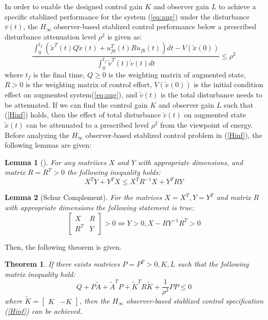 \documentclass{ieeeaccess}
\newtheorem{theorem}{Theorem}
\newtheorem{lemma}{Lemma}
\begin{document}
In order to enable the designed control gain $K$ and observer gain $L$ to achieve a specific stablized performance for the system (\ref{eq:aug}) under the disturbance $\bar{v}(t)$, the $H_\infty$ observer-based stablized control performance below a prescribed disturbance attenuation level $\rho^2$ is given as:
\begin{equation} \label{Hinf}
        \frac{\int_{0}^{t_f}(\tilde{x}^T(t)Q\tilde{x}(t) + u_{fb}^T(t)Ru_{fb}(t))dt - V(\tilde{x}(0))}{\int_{0}^{t_f}\tilde{v}^T(t)\tilde{v}(t)dt}\leq \rho^2
\end{equation}
where $t_f$ is the final time, $Q \geq 0$ is the weighting matrix of augmented state, $R > 0$ is the weighting matrix of control effort, $V(\tilde{x}(0))$ is the initial condition effect on augmented system(\ref{eq:aug}), and $\tilde{v}(t)$ is the total disturbance needs to be attenuated. If we can find the control gain $K$ and observer gain $L$ such that (\ref{Hinf}) holds, then the effect of total disturbance $\tilde{v}(t)$ on augmented state $\tilde{x}(t)$ can be attenuated to a prescribed level $\rho^2$ from the viewpoint of energy. Before analyzing the $H_\infty$ observer-based stablized control problem in (\ref{Hinf}), the following lemmas are given:
\begin{lemma}[\cite{boyd1994linear}] \label{lemma1}
    For any matriices $X$ and $Y$ with appropriate dimensions, and matrix $R=R^T>0$ the following inequality holds:
    \begin{equation} \label{}
        X^T Y + Y^T X \leq X^T R^{-1}X + Y^T R Y
    \end{equation}  
\end{lemma}
\begin{lemma}[Schur Complement\cite{boyd1994linear}] \label{lemma2}
    For the matrices $X=X^T,Y=Y^T$ and matrix $R$ with appropriate dimensions the following statement is true:
    \begin{equation} \label{}
        \begin{bmatrix}
            X & R \\ R^T & Y 
        \end{bmatrix} > 0 \Leftrightarrow Y>0, X-RY^{-1}R^T>0
    \end{equation}
\end{lemma}
Then, the following theorem is given.
\begin{theorem} \label{theorem1}
    If there exists matrices $P=P^T>0, K,L$ such that the following matrix inequality hold:
    \begin{equation} \label{BMI1}
        Q + P\tilde{A} + \tilde{A}^T P + \tilde{K}^TR\tilde{K} + \frac{1}{\rho^2}PP \leq 0
    \end{equation}
    where $\tilde{K}=\begin{bmatrix}
        K & -K
    \end{bmatrix}$, then the $H_\infty$ observer-based stablized control specification (\ref{Hinf}) can be achieved.
\end{theorem}
\end{document}
